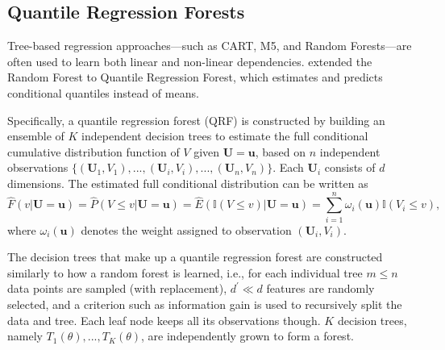 \documentclass[pdflatex,sn-basic]{sn-jnl}%
\theoremstyle{thmstyleone}%
\theoremstyle{thmstyletwo}%
\theoremstyle{thmstylethree}%
\begin{document}
\subsection{Quantile Regression Forests}
\label{subsec:QRF}

Tree-based regression approaches---such as CART, M5, and Random Forests---are often used to learn both linear and non-linear dependencies. \cite{meinshausen2006quantile} extended the Random Forest to Quantile Regression Forest, which estimates and predicts conditional quantiles instead of means. 

Specifically, a quantile regression forest (QRF) is constructed by building an ensemble of $K$ independent decision trees to estimate the full conditional cumulative distribution function of $V$ given $\mathbf{U} = \mathbf{u}$, based on $n$ independent observations $\{(\mathbf{U}_{1},V_{1}),...,(\mathbf{U}_{i},V_{i}),...,(\mathbf{U}_{n},V_{n})\}$. Each $\mathbf{U}_{i}$ consists of $d$ dimensions. The estimated full conditional distribution can be written as
\begin{equation}
\hat{F}(v \vert \mathbf{U}=\mathbf{u}) = \hat{P}(V \leq v \vert \mathbf{U}=\mathbf{u}) = \hat{E}( \mathbb{I}(V \leq v) \vert \mathbf{U}=\mathbf{u}) = \sum_{i=1}^{n}\omega_{i}(\mathbf{u})\mathbb{I}(V_i \leq v),
\label{eq1}
\end{equation}
where $\omega_{i}(\mathbf{u})$ denotes the weight assigned to observation $(\mathbf{U}_{i},V_{i})$. 

The decision trees that make up a quantile regression forest are constructed similarly to how a random forest is learned, i.e., for each individual tree $m \leq n$ data points are sampled (with replacement), $d^{'} \ll d$ features are randomly selected, and a criterion such as information gain is used to recursively split the data and tree. Each leaf node keeps all its observations though. $K$ decision trees, namely $T_{1}(\theta),...,T_{K}(\theta)$, are independently grown to form a forest.
\end{document}
